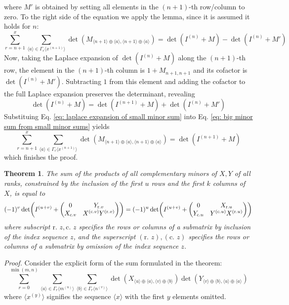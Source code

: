 \documentclass[12pt]{article}
\newcommand{\seq}[1]{\langle #1\rangle}
\newtheorem{theorem}{Theorem}[section]
\begin{document}
	where $M'$ is obtained by setting all elements in the $(n+1)$-th row/column to zero. To the right side of the equation we apply the lemma, since it is assumed it holds for $n$:
	\begin{equation} \label{eq: big minor sum from small minor sums}
	\sum_{r=n+1}^{x}\sum_{\seq{a}\in\Gamma_r\seq{x^{(n+1)}}}\det(M_{\seq{n+1}\oplus\seq{a},\seq{n+1}\oplus\seq{a}})=\det(I^{(n)}+M)-\det(I^{(n)}+M')
	\end{equation}
	Now, taking the Laplace expansion of $\det(I^{(n)}+M)$ along the $(n+1)$-th row, the element in the $(n+1)$-th column is $1+M_{n+1,n+1}$ and its cofactor is $\det(I^{(n)}+M')$. Subtracting $1$ from this element and adding the cofactor to the full Laplace expansion preserves the determinant, revealing
	\begin{equation} \label{eq: laplace expansion of small minor sum}
	\det(I^{(n)}+M)=\det(I^{(n+1)}+M)+\det(I^{(n)}+M')
	\end{equation}
	Substituing Eq. \ref{eq: laplace expansion of small minor sum} into Eq. \ref{eq: big minor sum from small minor sums} yields
	\begin{equation}
	\sum_{r=n+1}^{x}\sum_{\seq{a}\in\Gamma_r\seq{x^{(n+1)}}}\det(M_{\seq{n+1}\oplus\seq{a},\seq{n+1}\oplus\seq{a}})=\det(I^{(n+1)}+M)
	\end{equation}
	which finishes the proof.
	
	\begin{theorem}
	The sum of the products of all complementary minors of $X, Y$  of all ranks, constrained by the inclusion of the first $u$ rows and the first $k$ columns of $X$, is equal to
	\begin{equation}
	(-1)^v\det(I^{(u+v)}+\mqty(0 & Y_{\text{r.} v} \\ X_{\text{c.} v} & X^{(\text{c.} v)} Y^{(\text{r.} v)}))=(-1)^u\det(I^{(u+v)}+\mqty(0 & X_{\text{r.} u} \\ Y_{\text{c.} u} & Y^{(\text{c.} u)} X^{(\text{r.} u)}))
	\end{equation}
	where subscript $\text{r. }z,\text{c. }z$ specifies the rows or columns of a submatrix by inclusion of the index sequence $z$, and the superscript $(\text{r. }z),(\text{c. }z)$ specifies the rows or columns of a submatrix by omission of the index sequence $z$.
	\end{theorem}
	\textit{Proof.} Consider the explicit form of the sum formulated in the theorem:
	\begin{equation}
	\sum_{r=0}^{\min(m,n)}\sum_{\seq{a}\in\Gamma_r\seq{m^{(u)}}}\sum_{\seq{b}\in\Gamma_r\seq{n^{(v)}}}\det(X_{\seq{u}\oplus\seq{a},\seq{v}\oplus\seq{b}})\det(Y_{\seq{v}\oplus\seq{b},\seq{u}\oplus\seq{a}})
	\end{equation}
	where $\seq{x^{(y)}}$ signifies the sequence $\seq{x}$ with the first $y$ elements omitted.
	
\end{document}
